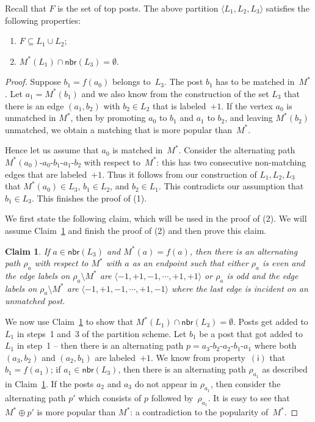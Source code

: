 \documentclass[11pt]{llncs}
\newtheorem{new-claim}{Claim}
\newcommand{\Nbr}{\mathsf{nbr}}
\begin{document}
\begin{lemma}
\label{lemma-F} 
Recall that $F$ is the set of top posts. The above partition $\langle L_1,L_2,L_3\rangle$ satisfies the following properties:
\begin{enumerate}[1.]
\item $F \subseteq L_1 \cup L_2$;
\item $M^*(L_1) \cap \Nbr(L_3) = \emptyset$.
\end{enumerate}
\end{lemma}
\begin{proof}
Suppose $b_1 = f(a_0)$ belongs to~$L_3$. The post $b_1$ has to be matched 
in~$M^*$. Let $a_1 = M^*(b_1)$ and we also know from the construction of the set $L_3$ that 
there is an edge $(a_1,b_2)$ with $b_2 \in L_2$ that is labeled~$+1$. If the vertex $a_0$ is 
unmatched in $M^*$, then by promoting $a_0$ to $b_1$ and $a_1$ to $b_2$, 
and leaving $M^*(b_2)$ unmatched, we obtain a matching that is more popular than~$M^*$.

Hence let us assume that $a_0$ is matched in~$M^*$. Consider the alternating path 
$M^*(a_0)$-$a_0$-$b_1$-$a_1$-$b_2$ with respect to~$M^*$: this has two consecutive non-matching 
edges that are labeled~$+1$. Thus it follows from our construction of $L_1,L_2,L_3$ that 
$M^*(a_0) \in L_3$, $b_1 \in L_2$, and $b_2 \in L_1$. 
This contradicts our assumption that $b_1 \in L_3$. This finishes the proof of (1).

\smallskip

We first state the following claim, which will be used in the proof of (2). We will assume Claim~\ref{lem:alt-path}
and finish the proof of (2) and then prove this claim.
\begin{new-claim}
\label{lem:alt-path}
If $a \in \Nbr(L_3)$ and $M^*(a) = f(a)$, then there is an alternating path $\rho_a$ with respect to $M^*$ 
with $a$ as an endpoint such that either $\rho_a$ is even and  the edge labels on $\rho_a \setminus M^*$ 
are $\langle -1,+1,-1,\cdots,+1,+1\rangle$ or $\rho_a$ is odd and the edge labels on $\rho_a \setminus M^*$ are 
$\langle -1,+1,-1,\cdots,+1,-1\rangle$ where the last edge is incident on an unmatched post.
\end{new-claim}


We now use Claim~\ref{lem:alt-path} to show that $M^*(L_1) \cap \Nbr(L_3) = \emptyset$.
Posts get added to $L_1$ in steps~1 and~3 of the partition scheme. 
Let $b_1$ be a post that got added to $L_1$ in step~1 -- then there is an alternating path 
$p = a_3$-$b_2$-$a_2$-$b_1$-$a_1$ where both $(a_3,b_2)$ and $(a_2,b_1)$ are labeled~$+1$. 
We know from property~$\mathsf{(i)}$ that $b_1 = f(a_1)$; if $a_1 \in \Nbr(L_3)$, then there is 
an alternating path $\rho_{a_1}$ as described in Claim~\ref{lem:alt-path}. If the posts $a_2$ and 
$a_3$ do not appear in $\rho_{a_1}$, then 
consider the alternating path $p'$ which consists of $p$ followed by~$\rho_{a_1}$. It is easy 
to see that $M^* \oplus p'$ is more popular than $M^*$: a contradiction to the popularity of~$M^*$. 


\end{proof}
\end{document}
